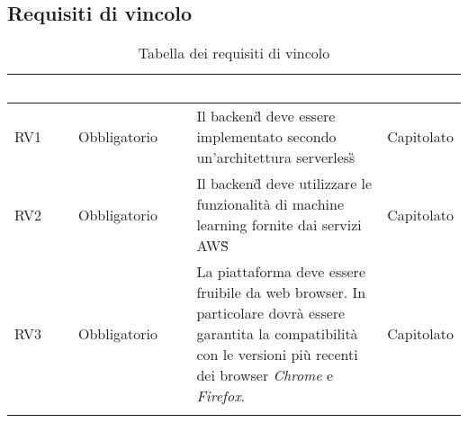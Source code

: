\subsection{Requisiti di vincolo}
{
      \setlength{\freewidth}{\dimexpr\textwidth-10\tabcolsep}
      \renewcommand{\arraystretch}{1.5}
      \centering
      \setlength{\aboverulesep}{0pt}
      \setlength{\belowrulesep}{0pt}
      \begin{longtable}{C{.15\freewidth} C{.2\freewidth} C{.528\freewidth} C{.15\freewidth}}
         \toprule
      \textcolor{white}{\textbf{Codice}}&
      \textcolor{white}{\textbf{Classificazione}}&
      \textcolor{white}{\textbf{Descrizione}}&
      \textcolor{white}{\textbf{Fonti}}\\	
      \toprule
      \endhead
      RV1 & Obbligatorio & Il backend\G{} deve essere implementato secondo un'architettura serverless\G{} & Capitolato \\
      RV2 & Obbligatorio & Il backend\G{} deve utilizzare le funzionalità di machine learning fornite dai servizi AWS\G{} & Capitolato \\
      RV3 & Obbligatorio & La piattaforma deve essere fruibile da web browser. In particolare dovrà essere garantita la compatibilità con le versioni più recenti dei browser \textit{Chrome} e \textit{Firefox}. & Capitolato \\
      \bottomrule
      \caption{Tabella dei requisiti di vincolo}
      \end{longtable}
}

